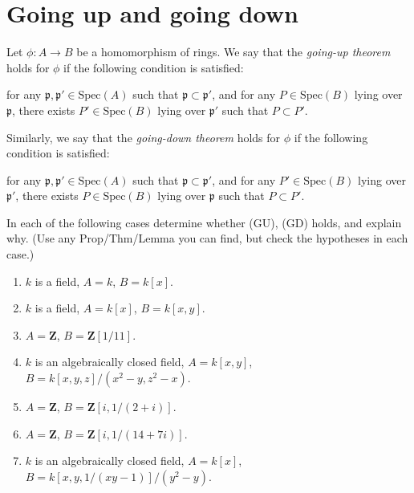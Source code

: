 \section{Going up and going down}
\label{section-going-up}


\begin{definition}
\label{definition-GU-GD}
Let $\phi: A \to B$ be a homomorphism of rings. We say
that the {\it going-up theorem} holds for $\phi$ if the
following condition is satisfied:
\begin{list}{(GU)}{}
\item for any ${\mathfrak p}, {\mathfrak p}' \in \text{Spec}(A)$ such that
${\mathfrak p} \subset {\mathfrak p}'$, and for any $P \in \text{Spec}(B)$ lying
over ${\mathfrak p}$, there exists $P'\in \text{Spec}(B)$ lying
over ${\mathfrak p}'$ such that $P \subset P'$.
\end{list}
Similarly, we say that the {\it going-down theorem} holds for $\phi$
if the following condition is satisfied:
\begin{list}{(GD)}{}
\item for any ${\mathfrak p}, {\mathfrak p}' \in \text{Spec}(A)$ such that
${\mathfrak p} \subset {\mathfrak p}'$, and for any
$P' \in \text{Spec}(B)$ lying
over ${\mathfrak p}'$, there exists $P\in \text{Spec}(B)$ lying
over ${\mathfrak p}$ such that $P \subset P'$.
\end{list}
\end{definition}

\begin{exercise}
\label{exercise-GU-GD}
In each of the following cases determine whether
(GU), (GD) holds, and explain why. (Use any Prop/Thm/Lemma you can find,
but check the hypotheses in each case.)
\begin{enumerate}
\item $k$ is a field, $A = k$, $B = k[x]$.
\item $k$ is a field, $A = k[x]$, $B = k[x, y]$.
\item $A = {\mathbf Z}$, $B = {\mathbf Z}[1/11]$.
\item $k$ is an algebraically closed field, $A = k[x, y]$,
$B = k[x, y, z]/(x^2-y, z^2-x)$.
\item $A = {\mathbf Z}$, $B = {\mathbf Z}[i, 1/(2 + i)]$.
\item $A = {\mathbf Z}$, $B = {\mathbf Z}[i, 1/(14 + 7i)]$.
\item $k$ is an algebraically closed field, $A = k[x]$,
$B = k[x, y, 1/(xy-1)]/(y^2-y)$.
\end{enumerate}
\end{exercise}

